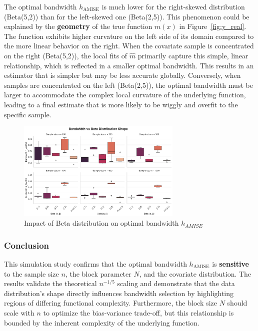 \documentclass{article}
\begin{document}
The optimal bandwidth \( h_{\text{AMISE}} \) is much lower for the right-skewed distribution (Beta(5,2)) than for the left-skewed one (Beta(2,5)). 
This phenomenon could be explained by the \textbf{geometry} of the true function \( m(x) \) in Figure~\ref{fig:y_real}. The function exhibits higher curvature on the left side of its domain compared to the more linear behavior on the right.
When the covariate sample is concentrated on the right (Beta(5,2)), the local fits of \( \hat{m} \) primarily capture this simple, linear relationship, which is reflected in a smaller optimal bandwidth. This results in an estimator 
that is simpler but may be less accurate globally. Conversely, when samples are concentrated on the left (Beta(2,5)), the optimal bandwidth must be larger to accommodate the complex local curvature of the underlying function, leading 
to a final estimate that is more likely to be wiggly and overfit to the specific sample.

\begin{figure}[H]
\centering
\includegraphics[width=0.70\textwidth]{plot3_beta_vs_bandwidth.png}
\caption{Impact of Beta distribution on optimal bandwidth $h_{AMISE}$}
\label{fig:beta}
\end{figure}


\subsubsection*{Conclusion}
This simulation study confirms that the optimal bandwidth $h_{\text{AMISE}}$ is \textbf{sensitive} to the sample size $n$, the block parameter $N$, and the covariate distribution. 
The results validate the theoretical $n^{-1/5}$ scaling and demonstrate that the data distribution's shape directly influences bandwidth selection by highlighting regions of differing functional complexity. 
Furthermore, the block size $N$ should scale with $n$ to optimize the bias-variance trade-off, but this relationship is bounded by the inherent complexity of the underlying function.
\end{document}
